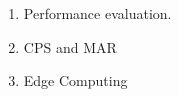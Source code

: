 


\begin{enumerate}
    \item Performance evaluation.
    \item \gls{CPS} and \gls{MAR}
    \item Edge Computing 
\end{enumerate}
